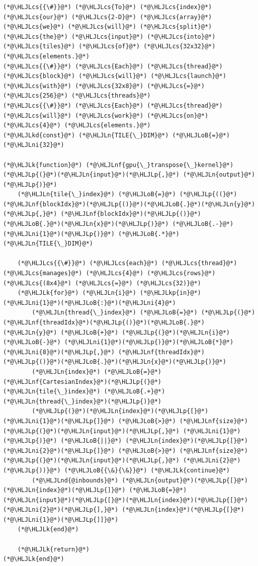 \documentclass[12pt,a4paper]{article}
\newcommand{\HLJLk}[1]{\textcolor[RGB]{148,91,176}{\textbf{#1}}}
\newcommand{\HLJLkd}[1]{\textcolor[RGB]{214,102,97}{\textit{#1}}}
\newcommand{\HLJLkp}[1]{\textcolor[RGB]{148,91,176}{\textbf{#1}}}
\newcommand{\HLJLn}[1]{#1}
\newcommand{\HLJLnd}[1]{\textcolor[RGB]{214,102,97}{#1}}
\newcommand{\HLJLnf}[1]{\textcolor[RGB]{66,102,213}{#1}}
\newcommand{\HLJLni}[1]{\textcolor[RGB]{59,151,46}{#1}}
\newcommand{\HLJLoB}[1]{\textcolor[RGB]{102,102,102}{\textbf{#1}}}
\newcommand{\HLJLp}[1]{#1}
\newcommand{\HLJLcs}[1]{\textcolor[RGB]{153,153,119}{\textit{#1}}}
\begin{document}
\begin{lstlisting}
(*@\HLJLcs{{\#}}@*) (*@\HLJLcs{To}@*) (*@\HLJLcs{index}@*) (*@\HLJLcs{our}@*) (*@\HLJLcs{2-D}@*) (*@\HLJLcs{array}@*) (*@\HLJLcs{we}@*) (*@\HLJLcs{will}@*) (*@\HLJLcs{split}@*) (*@\HLJLcs{the}@*) (*@\HLJLcs{input}@*) (*@\HLJLcs{into}@*) (*@\HLJLcs{tiles}@*) (*@\HLJLcs{of}@*) (*@\HLJLcs{32x32}@*) (*@\HLJLcs{elements.}@*) 
(*@\HLJLcs{{\#}}@*) (*@\HLJLcs{Each}@*) (*@\HLJLcs{thread}@*) (*@\HLJLcs{block}@*) (*@\HLJLcs{will}@*) (*@\HLJLcs{launch}@*) (*@\HLJLcs{with}@*) (*@\HLJLcs{32x8}@*) (*@\HLJLcs{=}@*) (*@\HLJLcs{256}@*) (*@\HLJLcs{threads}@*) 
(*@\HLJLcs{{\#}}@*) (*@\HLJLcs{Each}@*) (*@\HLJLcs{thread}@*) (*@\HLJLcs{will}@*) (*@\HLJLcs{work}@*) (*@\HLJLcs{on}@*) (*@\HLJLcs{4}@*) (*@\HLJLcs{elements.}@*)
(*@\HLJLkd{const}@*) (*@\HLJLn{TILE{\_}DIM}@*) (*@\HLJLoB{=}@*) (*@\HLJLni{32}@*)

(*@\HLJLk{function}@*) (*@\HLJLnf{gpu{\_}transpose{\_}kernel}@*)(*@\HLJLp{(}@*)(*@\HLJLn{input}@*)(*@\HLJLp{,}@*) (*@\HLJLn{output}@*)(*@\HLJLp{)}@*)
    (*@\HLJLn{tile{\_}index}@*) (*@\HLJLoB{=}@*) (*@\HLJLp{((}@*)(*@\HLJLnf{blockIdx}@*)(*@\HLJLp{()}@*)(*@\HLJLoB{.}@*)(*@\HLJLn{y}@*)(*@\HLJLp{,}@*) (*@\HLJLnf{blockIdx}@*)(*@\HLJLp{()}@*)(*@\HLJLoB{.}@*)(*@\HLJLn{x}@*)(*@\HLJLp{)}@*) (*@\HLJLoB{.-}@*) (*@\HLJLni{1}@*)(*@\HLJLp{)}@*) (*@\HLJLoB{.*}@*) (*@\HLJLn{TILE{\_}DIM}@*)
    
    (*@\HLJLcs{{\#}}@*) (*@\HLJLcs{each}@*) (*@\HLJLcs{thread}@*) (*@\HLJLcs{manages}@*) (*@\HLJLcs{4}@*) (*@\HLJLcs{rows}@*) (*@\HLJLcs{(8x4}@*) (*@\HLJLcs{=}@*) (*@\HLJLcs{32)}@*)
    (*@\HLJLk{for}@*) (*@\HLJLn{i}@*) (*@\HLJLkp{in}@*) (*@\HLJLni{1}@*)(*@\HLJLoB{:}@*)(*@\HLJLni{4}@*)
        (*@\HLJLn{thread{\_}index}@*) (*@\HLJLoB{=}@*) (*@\HLJLp{(}@*)(*@\HLJLnf{threadIdx}@*)(*@\HLJLp{()}@*)(*@\HLJLoB{.}@*)(*@\HLJLn{y}@*) (*@\HLJLoB{+}@*) (*@\HLJLp{(}@*)(*@\HLJLn{i}@*) (*@\HLJLoB{-}@*) (*@\HLJLni{1}@*)(*@\HLJLp{)}@*)(*@\HLJLoB{*}@*)(*@\HLJLni{8}@*)(*@\HLJLp{,}@*) (*@\HLJLnf{threadIdx}@*)(*@\HLJLp{()}@*)(*@\HLJLoB{.}@*)(*@\HLJLn{x}@*)(*@\HLJLp{)}@*)
        (*@\HLJLn{index}@*) (*@\HLJLoB{=}@*) (*@\HLJLnf{CartesianIndex}@*)(*@\HLJLp{(}@*)(*@\HLJLn{tile{\_}index}@*) (*@\HLJLoB{.+}@*) (*@\HLJLn{thread{\_}index}@*)(*@\HLJLp{)}@*)
        (*@\HLJLp{(}@*)(*@\HLJLn{index}@*)(*@\HLJLp{[}@*)(*@\HLJLni{1}@*)(*@\HLJLp{]}@*) (*@\HLJLoB{>}@*) (*@\HLJLnf{size}@*)(*@\HLJLp{(}@*)(*@\HLJLn{input}@*)(*@\HLJLp{,}@*) (*@\HLJLni{1}@*)(*@\HLJLp{)}@*) (*@\HLJLoB{||}@*) (*@\HLJLn{index}@*)(*@\HLJLp{[}@*)(*@\HLJLni{2}@*)(*@\HLJLp{]}@*) (*@\HLJLoB{>}@*) (*@\HLJLnf{size}@*)(*@\HLJLp{(}@*)(*@\HLJLn{input}@*)(*@\HLJLp{,}@*) (*@\HLJLni{2}@*)(*@\HLJLp{))}@*) (*@\HLJLoB{{\&}{\&}}@*) (*@\HLJLk{continue}@*)
        (*@\HLJLnd{@inbounds}@*) (*@\HLJLn{output}@*)(*@\HLJLp{[}@*)(*@\HLJLn{index}@*)(*@\HLJLp{]}@*) (*@\HLJLoB{=}@*) (*@\HLJLn{input}@*)(*@\HLJLp{[}@*)(*@\HLJLn{index}@*)(*@\HLJLp{[}@*)(*@\HLJLni{2}@*)(*@\HLJLp{],}@*) (*@\HLJLn{index}@*)(*@\HLJLp{[}@*)(*@\HLJLni{1}@*)(*@\HLJLp{]]}@*)
    (*@\HLJLk{end}@*)

    (*@\HLJLk{return}@*)
(*@\HLJLk{end}@*)
\end{lstlisting}
\end{document}
